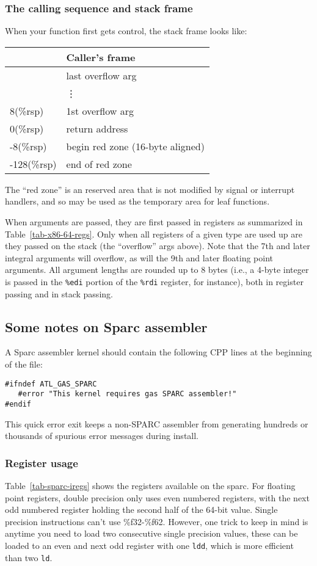 \documentclass[11pt]{article}
\begin{document}
\subsubsection{The calling sequence and stack frame}
When your function first gets control, the stack frame looks like: \\
\begin{center}
\begin{tabular}{l|l|}
        & Caller's frame \\\hline
        & last overflow arg \\\hline
        & \vdots \\\hline
8(\%rsp) & 1st overflow arg \\\hline
0(\%rsp) & return address \\\hline
-8(\%rsp)& begin red zone (16-byte aligned)\\\hline
-128(\%rsp) & end of red zone \\\hline
\end{tabular}
\end{center}

The ``red zone'' is an reserved area that is not modified by signal or 
interrupt handlers, and so may be used as the temporary area for leaf
functions.

When arguments are passed, they are first passed in registers as
summarized in Table~\ref{tab-x86-64-regs}.  Only when all registers of
a given type are used up are they passed on the stack (the ``overflow''
args above).  
Note that the 7th and later integral arguments will overflow, as will the 
9th and later floating point arguments.
All argument lengths are rounded up to 8 bytes (i.e., a
4-byte integer is passed in the {\tt \%edi} portion of the {\tt \%rdi}
register, for instance), both in register passing and in stack passing.

\subsection{Some notes on Sparc assembler}
A Sparc assembler kernel should contain the following CPP lines at the
beginning of the file:
\begin{verbatim}
#ifndef ATL_GAS_SPARC
   #error "This kernel requires gas SPARC assembler!"
#endif
\end{verbatim}
This quick error exit keeps a non-SPARC assembler from generating hundreds
or thousands of spurious error messages during install.

\subsubsection{Register usage}
Table~\ref{tab-sparc-iregs} shows the registers available on the
sparc.  For floating point registers, double precision only uses even 
numbered registers, with the next odd numbered register holding the second
half of the 64-bit value.  Single precision instructions can't use
\%f32-\%f62.  However, one trick to keep in mind is anytime you need to load
two consecutive single precision values, these can be loaded to an even and
next odd register with one {\tt ldd}, which is more efficient than two {\tt ld}.
\end{document}
